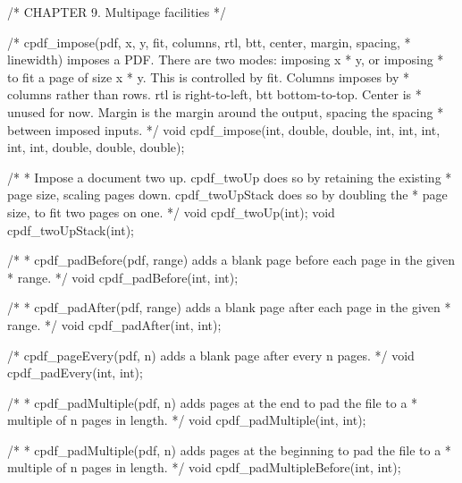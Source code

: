 /* CHAPTER 9. Multipage facilities */

/* cpdf_impose(pdf, x, y, fit, columns, rtl, btt, center, margin, spacing,
 * linewidth) imposes a PDF. There are two modes: imposing x * y, or imposing
 * to fit a page of size x * y. This is controlled by fit. Columns imposes by
 * columns rather than rows. rtl is right-to-left, btt bottom-to-top. Center is
 * unused for now. Margin is the margin around the output, spacing the spacing
 * between imposed inputs. */
void cpdf_impose(int, double, double, int, int, int, int, int, double, double,
                 double);

/*
 * Impose a document two up. cpdf_twoUp does so by retaining the existing
 * page size, scaling pages down. cpdf_twoUpStack does so by doubling the
 * page size, to fit two pages on one.
 */
void cpdf_twoUp(int);
void cpdf_twoUpStack(int);

/*
 * cpdf_padBefore(pdf, range) adds a blank page before each page in the given
 * range.
 */
void cpdf_padBefore(int, int);

/*
 * cpdf_padAfter(pdf, range) adds a blank page after each page in the given
 * range.
 */
void cpdf_padAfter(int, int);

/* cpdf_pageEvery(pdf, n) adds a blank page after every n pages. */
void cpdf_padEvery(int, int);

/*
 * cpdf_padMultiple(pdf, n) adds pages at the end to pad the file to a
 * multiple of n pages in length.
 */
void cpdf_padMultiple(int, int);

/*
 * cpdf_padMultiple(pdf, n) adds pages at the beginning to pad the file to a
 * multiple of n pages in length.
 */
void cpdf_padMultipleBefore(int, int);

